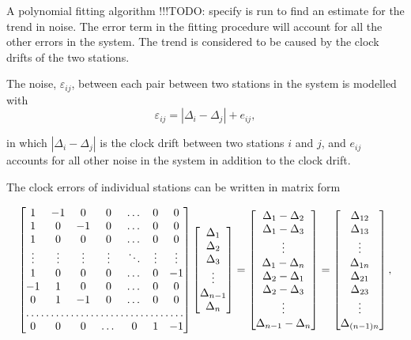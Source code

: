 \documentclass[12pt,a4paper,english]{article}
\newcommand\todo[1]{{\color{red}!!!TODO: #1}}
\begin{document}
A polynomial fitting algorithm \todo{specify} is run to find an estimate for the trend in noise. The error term in the fitting procedure will account for all the other errors in the system. The trend is considered to be caused by the clock drifts of the two stations. 

The noise, $\varepsilon_{ij}$, between each pair between two stations in the system is modelled with 
\begin{equation}
\varepsilon_{ij} = | \Delta_i - \Delta_j | + e_{ij},
\end{equation}

in which $ | \Delta_i - \Delta_j | $ is the clock drift between two stations $i$ and $j$, and $e_{ij}$ accounts for all other noise in the system in addition to the clock drift. 

The clock errors of individual stations can be written in matrix form 

\begin{equation*}
\begin{bmatrix}
1 & -1 & 0 & 0 & \dots & 0 & 0 \\
1 & 0 & -1 & 0 & \dots & 0 & 0 \\
1 &  0  & 0 & 0 & \dots & 0  & 0 \\
\vdots & \vdots & \vdots & \vdots & \ddots & \vdots & \vdots \\
1 &  0  & 0 & 0 & \dots & 0 & -1 \\
-1 & 1 & 0 & 0 & \dots & 0  & 0 \\
0 & 1 & -1 & 0 & \dots & 0 & 0 \\
\hdotsfor{7} \\
0 & 0 & 0 & \dots & 0& 1 & -1
\end{bmatrix}
 \begin{bmatrix}
\Delta_1 \\ \Delta_2 \\ \Delta_3 \\ \vdots \\ \Delta_{n-1} \\ \Delta_n
\end{bmatrix}
 = 
 \begin{bmatrix}
 \Delta_1 - \Delta_2 \\ \Delta_1-\Delta_3 \\ \vdots \\ \Delta_1 - \Delta_{n} \\ \Delta_2- \Delta_1 \\ \Delta_2 - \Delta_3 \\ \vdots \\ \Delta_{n-1} - \Delta_n
 \end{bmatrix}
= 
\begin{bmatrix}
\Delta_{12} \\ \Delta_{13} \\ \vdots \\ \Delta_{1n} \\ \Delta_{21} \\ \Delta_{23} \\ \vdots \\ \Delta_{(n-1)n}
\end{bmatrix}, 
\end{equation*}
\end{document}
